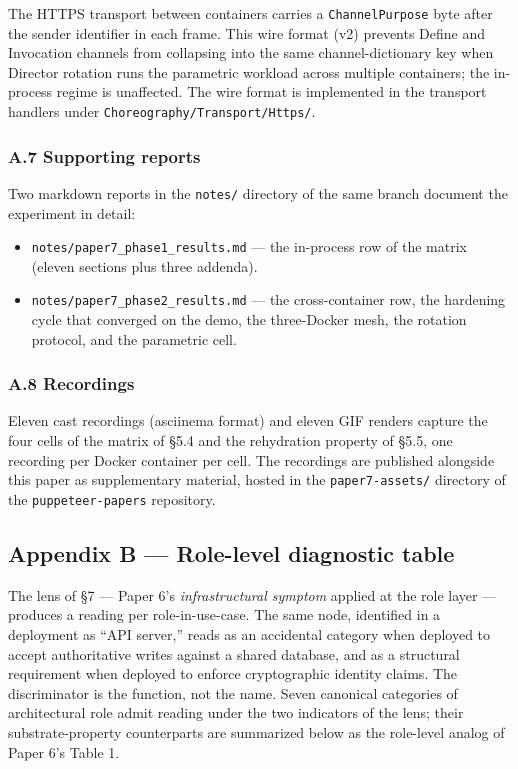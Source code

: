 \documentclass[
]{article}
\providecommand{\tightlist}{%
  \setlength{\itemsep}{0pt}\setlength{\parskip}{0pt}}
\begin{document}
The HTTPS transport between containers carries a \texttt{ChannelPurpose}
byte after the sender identifier in each frame. This wire format (v2)
prevents Define and Invocation channels from collapsing into the same
channel-dictionary key when Director rotation runs the parametric
workload across multiple containers; the in-process regime is
unaffected. The wire format is implemented in the transport handlers
under \texttt{Choreography/Transport/Https/}.

\subsubsection{A.7 Supporting reports}\label{a.7-supporting-reports}

Two markdown reports in the \texttt{notes/} directory of the same branch
document the experiment in detail:

\begin{itemize}
\tightlist
\item
  \texttt{notes/paper7\_phase1\_results.md} --- the in-process row of
  the matrix (eleven sections plus three addenda).
\item
  \texttt{notes/paper7\_phase2\_results.md} --- the cross-container row,
  the hardening cycle that converged on the demo, the three-Docker mesh,
  the rotation protocol, and the parametric cell.
\end{itemize}

\subsubsection{A.8 Recordings}\label{a.8-recordings}

Eleven cast recordings (asciinema format) and eleven GIF renders capture
the four cells of the matrix of §5.4 and the rehydration property of
§5.5, one recording per Docker container per cell. The recordings are
published alongside this paper as supplementary material, hosted in the
\texttt{paper7-assets/} directory of the \texttt{puppeteer-papers}
repository.

\subsection{Appendix B --- Role-level diagnostic
table}\label{appendix-b-role-level-diagnostic-table}

The lens of §7 --- Paper 6's \emph{infrastructural symptom} applied at
the role layer --- produces a reading per role-in-use-case. The same
node, identified in a deployment as ``API server,'' reads as an
accidental category when deployed to accept authoritative writes against
a shared database, and as a structural requirement when deployed to
enforce cryptographic identity claims. The discriminator is the
function, not the name. Seven canonical categories of architectural role
admit reading under the two indicators of the lens; their
substrate-property counterparts are summarized below as the role-level
analog of Paper 6's Table 1.
\end{document}
